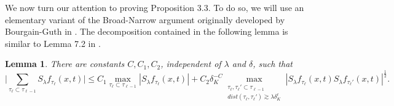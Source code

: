 \documentclass[11pt]{amsart}
\numberwithin{equation}{section}
\newcommand{\la}{\lambda}
\newcommand{\Sl}{S_{\la}}
\newcommand{\dK}[1]{\delta_{K}^{#1}}
\newtheorem{lemma}[theorem]{Lemma}
\begin{document}
We now turn our attention to proving Proposition 3.3. To do so, we will use an elementary variant of the Broad-Narrow argument originally developed by Bourgain-Guth in \cite{BourgainGuthMultilinear}. The decomposition contained in the following lemma is similar to Lemma 7.2 in \cite{demeter2020fourier}.

\begin{lemma}
    There are constants $C, C_1, C_2$, independent of $\la$ and $\delta$, such that 
    \begin{equation}
        \Big|\sum_{\tau_{\ell} \subset \tau_{\ell - 1}}\Sl f_{\tau_{\ell}}(x,t)\Big| \leq C_1 \max_{\tau_{\ell} \subset \tau_{\ell - 1}}|\Sl f_{\tau_{\ell}}(x,t) | + C_2 \dK{-C}\max_{\substack{\tau_{\ell},\tau_{\ell}' \subset \tau_{\ell - 1} \\ dist(\tau_{\ell}, \tau_{\ell}') \gtrsim \la \dK{\ell}}}|\Sl f_{\tau_{\ell}}(x,t)\Sl f_{\tau_{\ell}'}(x,t)|^{\frac{1}{2}}.
    \end{equation}
\end{lemma}
\end{document}
